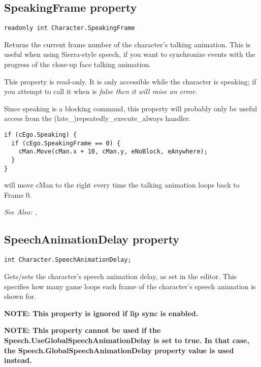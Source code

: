 \subsection{SpeakingFrame property}\label{Character.SpeakingFrame}%

\begin{verbatim}
readonly int Character.SpeakingFrame
\end{verbatim}
Returns the current frame number of the character's talking animation. This is
useful when using Sierra-style speech, if you want to synchronize events with the
progress of the close-up face talking animation.

This property is read-only. It is only accessible while the character is speaking;
if you attempt to call it when  is
\it{false} then it will raise an error.

Since speaking is a blocking command, this property will probably only be useful
access from the (late_)repeatedly_execute_always handler.

\begin{verbatim}
if (cEgo.Speaking) {
  if (cEgo.SpeakingFrame == 0) {
    cMan.Move(cMan.x + 10, cMan.y, eNoBlock, eAnywhere);
  }
}
\end{verbatim}
will move cMan to the right every time the talking animation loops back to Frame 0.

\it{See Also:} ,


\subsection{SpeechAnimationDelay property}\label{Character.SpeechAnimationDelay}%

\begin{verbatim}
int Character.SpeechAnimationDelay;
\end{verbatim}

Gets/sets the character's speech animation delay, as set in the editor. This specifies
how many game loops each frame of the character's speech animation is shown for.

\bf{NOTE:} This property is ignored if lip sync is enabled.

\bf{NOTE:} This property \bf{cannot} be used if the Speech.UseGlobalSpeechAnimationDelay is set to \bf{true}. In that case, the Speech.GlobalSpeechAnimationDelay property value is used instead.

